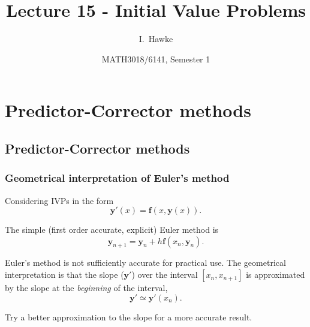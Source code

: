 \documentclass{beamer}
\title[Lecture 15] %
{Lecture 15 - Initial Value Problems}
\author[I. Hawke] %
{I.~Hawke}
\institute[University of Southampton] %
{
  School of Mathematics, \\
  University of Southampton, UK
}
\date[Semester 1] %
{MATH3018/6141, Semester 1}
\newcommand{\by}{{\boldsymbol{y}}}
\newcommand{\bfm}[1]{{\boldsymbol{#1}}}
\begin{document}
\begin{frame}
  \titlepage
\end{frame}

\section{Predictor-Corrector methods}

\subsection{Predictor-Corrector methods}

\begin{frame}
  \frametitle{Geometrical interpretation of Euler's method}

  Considering IVPs in the form
  \begin{equation*}
    \by'(x) = \bfm{f}(x, \by(x)).
  \end{equation*}

  The simple (first order accurate, explicit) Euler method is
  \begin{equation*}
    \by_{n+1} = \by_n + h \bfm{f}(x_n, \by_n).
  \end{equation*} \pause

  Euler's method is not sufficiently accurate for practical use. The
  geometrical interpretation is that the slope ($\by'$) over the
  interval $[x_n, x_{n+1}]$ is approximated by the slope at the
  \emph{beginning} of the interval,
  \begin{equation*}
    \by' \simeq \by'(x_n).
  \end{equation*} \pause

  Try a better approximation to the slope for a more accurate result.

\end{frame}
\end{document}
